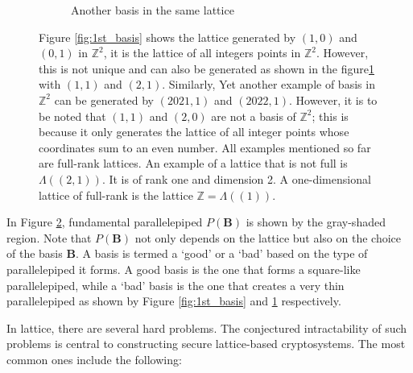 \begin{figure}[h!]
\begin{subfigure}[t]{0.48\textwidth}
\begin{tikzpicture}
        \end{tikzpicture}
        \caption{Another basis in the same lattice}
        \label{fig:2ed_basis}
    \end{subfigure}
    \caption{Figure \ref{fig:1st_basis} shows the lattice generated by $(1,0)$ and $(0,1)$ in $\mathbb{Z}^2$, it is the lattice of all integers points in $\mathbb{Z}^2$.
        However, this is not unique and can also be generated as shown in the figure\ref{fig:2ed_basis} with $(1,1)$ and $(2,1)$.
        Similarly, Yet another example of basis in $\mathbb{Z}^2$ can be generated by $(2021, 1)$ and $(2022, 1)$.
        However, it is to be noted that $(1, 1)$ and $(2,0)$ are not a basis of $\mathbb{Z}^2$; this is because it only generates the lattice of all integer points whose coordinates sum to an even number.
        All examples mentioned so far are full-rank lattices.
        An example of a lattice that is not full is $\Lambda((2, 1))$. It is of rank one and dimension 2.
        A one-dimensional lattice of full-rank is the lattice $\mathbb{Z}= \Lambda((1))$.}
    \label{fig:Basis_of_2d_lattice}
\end{figure}


In Figure \ref{fig:Basis_of_2d_lattice}, fundamental parallelepiped $P(\pmb{B})$ is shown by the gray-shaded region.
Note that $P(\pmb{B})$ not only depends on the lattice but also on the choice of the basis $\pmb{B}$.
A basis is termed a `good' or a `bad' based on the type of parallelepiped it forms.
A good basis is the one that forms a square-like parallelepiped, while a `bad' basis is the one that creates a very thin parallelepiped as shown by Figure \ref{fig:1st_basis} and \ref{fig:2ed_basis} respectively.

In lattice, there are several hard problems.
The conjectured intractability of such problems is central to constructing secure lattice-based cryptosystems.
The most common ones include the following:

